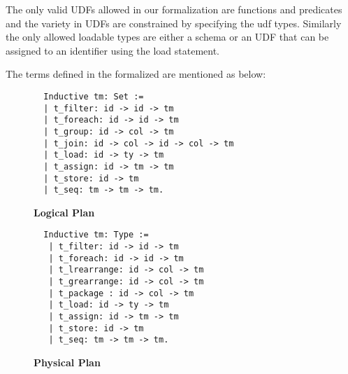 The only valid UDFs allowed in our formalization are functions and predicates and the variety in UDFs are constrained by specifying the udf types. Similarly the only allowed loadable types are either a schema or an UDF that can be assigned to an identifier using the load statement.


The terms defined in the formalized are mentioned as below:

\begin{figure}
\begin{minipage}{0.4\linewidth}
\begin{lstlisting}
  Inductive tm: Set :=
  | t_filter: id -> id -> tm
  | t_foreach: id -> id -> tm
  | t_group: id -> col -> tm
  | t_join: id -> col -> id -> col -> tm
  | t_load: id -> ty -> tm
  | t_assign: id -> tm -> tm
  | t_store: id -> tm
  | t_seq: tm -> tm -> tm.
\end{lstlisting}
\caption{\textbf{Logical Plan}}
\end{minipage}

\begin{minipage}{0.4\linewidth}
\begin{lstlisting}
  Inductive tm: Type :=
   | t_filter: id -> id -> tm
   | t_foreach: id -> id -> tm
   | t_lrearrange: id -> col -> tm
   | t_grearrange: id -> col -> tm
   | t_package : id -> col -> tm
   | t_load: id -> ty -> tm
   | t_assign: id -> tm -> tm
   | t_store: id -> tm
   | t_seq: tm -> tm -> tm.
\end{lstlisting}
\caption{\textbf{Physical Plan}}
\end{minipage}
\end{figure}

